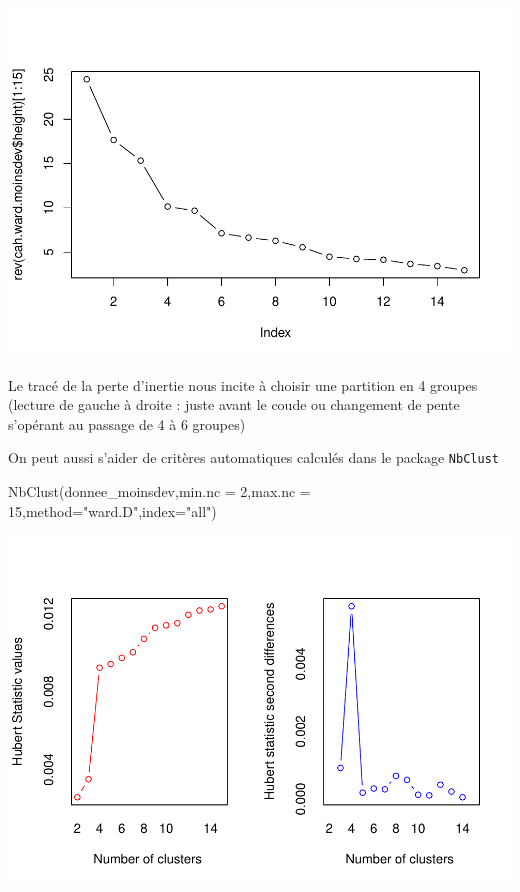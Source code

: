 \documentclass[
]{article}
\newenvironment{Shaded}{}{}
\newcommand{\AttributeTok}[1]{#1}
\newcommand{\DecValTok}[1]{#1}
\newcommand{\FunctionTok}[1]{#1}
\newcommand{\NormalTok}[1]{#1}
\newcommand{\StringTok}[1]{\textcolor[rgb]{0.00,0.50,0.50}{#1}}
\begin{document}
\includegraphics{Projet_files/figure-latex/unnamed-chunk-33-1.pdf}

Le tracé de la perte d'inertie nous incite à choisir une partition en 4
groupes (lecture de gauche à droite : juste avant le coude ou changement
de pente s'opérant au passage de 4 à 6 groupes)

On peut aussi s'aider de critères automatiques calculés dans le package
\texttt{NbClust}

\begin{Shaded}
\begin{Highlighting}[]
\FunctionTok{NbClust}\NormalTok{(donnee\_moinsdev,}\AttributeTok{min.nc =} \DecValTok{2}\NormalTok{,}\AttributeTok{max.nc =} \DecValTok{15}\NormalTok{,}\AttributeTok{method=}\StringTok{"ward.D"}\NormalTok{,}\AttributeTok{index=}\StringTok{"all"}\NormalTok{)}
\end{Highlighting}
\end{Shaded}

\includegraphics{Projet_files/figure-latex/unnamed-chunk-34-1.pdf}
\end{document}
